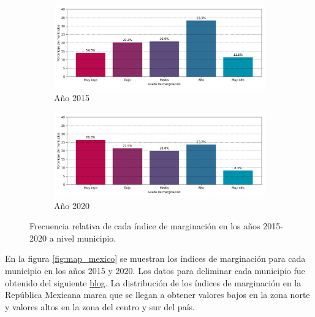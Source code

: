 \begin{figure}[H]
    \centering
    \begin{subfigure}{8.4cm}
        \caption{Año 2015}
        \includegraphics[width=1\linewidth]{Graphics/Data_2015/histogram_classes.png}
    \end{subfigure}
    \begin{subfigure}{8.4cm}
        \caption{Año 2020}
        \includegraphics[width=1\linewidth]{Graphics/Data_2020/histogram_classes.png}
    \end{subfigure}
    \caption{Frecuencia relativa de cada índice de marginación en los años 2015-2020 a nivel municipio.}
    \label{fig:frecuency_relative}
\end{figure}

En la figura \ref{fig:map_mexico} se muestran los índices de marginación para cada municipio en los años 2015 y 2020. Los datos para deliminar cada municipio fue obtenido del siguiente \href{https://blog.jjsantoso.com/mapas-distribucion-puntos/}{blog}\cite{mapa_mexico}. La distribución de los índices de marginación en la República Mexicana marca que se llegan a obtener valores bajos en la zona norte y valores altos en la zona del centro y sur del país.

